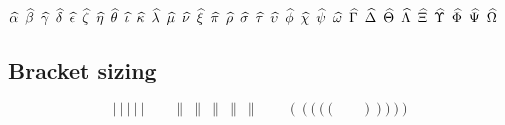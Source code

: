 \documentclass[noaddress, tikzl]{nmd/article}
\newcommand{\sizetest}[1]{%
  #1 \ \big#1 \ \Big#1 \ \bigg#1 \ \Bigg#1 %
}
\begin{document}
$\alphahat \enskip \betahat \enskip \gammahat \enskip \deltahat \enskip \epsilonhat \enskip \zetahat \enskip \etahat \enskip \thetahat \enskip \iotahat \enskip \kappahat \enskip \lambdahat \enskip \muhat \enskip \nuhat \enskip \xihat \enskip \pihat \enskip \rhohat \enskip \sigmahat \enskip \tauhat \enskip \upsilonhat \enskip \phihat \enskip \chihat \enskip \psihat \enskip \omegahat \enskip \Gammahat \enskip \Deltahat \enskip \Thetahat \enskip \Lambdahat \enskip \Xihat \enskip \Upsilonhat \enskip \Phihat \enskip \Psihat \enskip \Omegahat$

\subsection*{Bracket sizing}

\[
\sizetest{|} \qquad \sizetest{\|}  \qquad \sizetest{(} \qquad \sizetest{)}
\]


{\RaggedRight 
 

}
\end{document}
